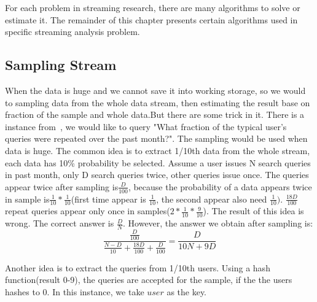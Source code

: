\begin{quote}
\begin{itemize}

\end{itemize}
\end{quote}

For each problem in streaming research, there are many algorithms to solve or
estimate it. The remainder of this chapter presents certain algorithms used in
specific streaming analysis problem.

\subsection{Sampling Stream}

When the data is huge and we cannot save it into working storage, so we would to
sampling data from the whole data stream, then estimating the result base on
fraction of the sample and whole data.But there are some trick in it. There is a
instance from~\cite{leskovec2014mining}, we would like to query "What fraction
of the typical user's queries were repeated over the past month?". The sampling
would be used when data is huge. The common idea is to extract 1/10th data from
the whole stream, each data has 10\% probability be selected. Assume a user
issues N search queries in past month, only D search queries twice, other
queries issue once. The queries appear twice after sampling is$\frac{D}{100}$,
because the probability of a data appears twice in sample
is$\frac{1}{10}*\frac{1}{10}$(first time appear is $\frac{1}{10}$, the second
appear also need $\frac{1}{10})$. $\frac{18D}{100}$ repeat queries appear only
once in samples($2*\frac{1}{10}*\frac{9}{10}$). The result of this idea is
wrong. The correct answer is $\frac{D}{N}$. However, the answer we obtain after
sampling is:
\begin{equation*}
    \frac{\frac{D}{100}}{\frac{N-D}{10}+\frac{18D}{100}+\frac{D}{100}} = \frac{D}{10N+9D}
\end{equation*}

Another idea is to extract the queries from 1/10th users. Using a hash
function(result 0-9), the queries are accepted for the sample, if the the users
hashes to 0. In this instance, we take $user$ as the key. 

